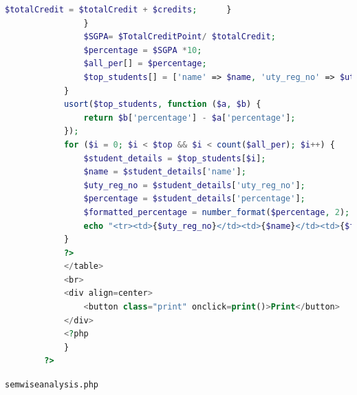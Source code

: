 \documentclass{nascproject}
\begin{document}
\begin{appendices}
\begin{lstlisting}[language=php]
                        $totalCredit = $totalCredit + $credits;      }
                } 
                $SGPA= $TotalCreditPoint/ $totalCredit;
                $percentage = $SGPA *10;            
                $all_per[] = $percentage; 
                $top_students[] = ['name' => $name, 'uty_reg_no' => $uty, 'percentage' => $percentage];       
            } 
            usort($top_students, function ($a, $b) {
                return $b['percentage'] - $a['percentage'];
            });
            for ($i = 0; $i < $top && $i < count($all_per); $i++) {
                $student_details = $top_students[$i];
                $name = $student_details['name'];
                $uty_reg_no = $student_details['uty_reg_no'];
                $percentage = $student_details['percentage'];
                $formatted_percentage = number_format($percentage, 2);
                echo "<tr><td>{$uty_reg_no}</td><td>{$name}</td><td>{$formatted_percentage }</td></tr>";
            }   
            ?>
            </table>
            <br>
            <div align=center>
                <button class="print" onclick=print()>Print</button>
            </div>
            <?php 
            }
        ?>
\end{lstlisting}
\texttt{semwiseanalysis.php}
\begin{lstlisting}[language=php]



\end{lstlisting}
\end{appendices}
\end{document}
